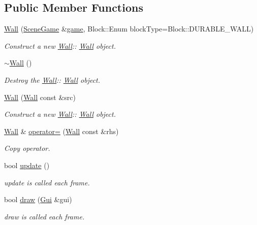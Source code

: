 \subsection*{Public Member Functions}
\begin{DoxyCompactItemize}
\item 
\hyperlink{class_wall_af9013d101f4409022a90b65572758b5a}{Wall} (\hyperlink{class_scene_game}{Scene\+Game} \&\hyperlink{class_a_entity_aa2c05db944a8b7487eb8470dd20211ab}{game}, Block\+::\+Enum block\+Type=Block\+::\+D\+U\+R\+A\+B\+L\+E\+\_\+\+W\+A\+LL)
\begin{DoxyCompactList}\small\item\em Construct a new \hyperlink{class_wall}{Wall}\+:\+: \hyperlink{class_wall}{Wall} object. \end{DoxyCompactList}\item 
\mbox{\label{class_wall_a9a2992f2b533e1c160513d1e719f920c}} 
\hyperlink{class_wall_a9a2992f2b533e1c160513d1e719f920c}{$\sim$\+Wall} ()
\begin{DoxyCompactList}\small\item\em Destroy the \hyperlink{class_wall}{Wall}\+:\+: \hyperlink{class_wall}{Wall} object. \end{DoxyCompactList}\item 
\hyperlink{class_wall_ac4e3877605a06087babebfecbbb8a458}{Wall} (\hyperlink{class_wall}{Wall} const \&src)
\begin{DoxyCompactList}\small\item\em Construct a new \hyperlink{class_wall}{Wall}\+:\+: \hyperlink{class_wall}{Wall} object. \end{DoxyCompactList}\item 
\hyperlink{class_wall}{Wall} \& \hyperlink{class_wall_ad5639b5bcbe08c8348dac17d2d5e2af3}{operator=} (\hyperlink{class_wall}{Wall} const \&rhs)
\begin{DoxyCompactList}\small\item\em Copy operator. \end{DoxyCompactList}\item 
bool \hyperlink{class_wall_a29d3c4daa11dbb20d758b1fc285ed7a4}{update} ()
\begin{DoxyCompactList}\small\item\em update is called each frame. \end{DoxyCompactList}\item 
bool \hyperlink{class_wall_ab3ea42b91f7830d22782901d61be505f}{draw} (\hyperlink{class_gui}{Gui} \&gui)
\begin{DoxyCompactList}\small\item\em draw is called each frame. \end{DoxyCompactList}\end{DoxyCompactItemize}
